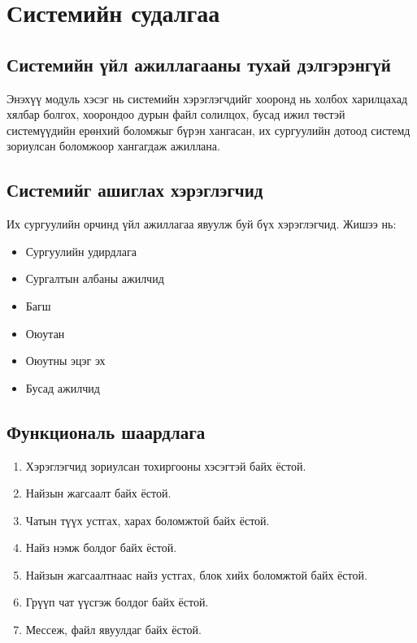 
\chapter{Системийн судалгаа} %
\label{Chapter2} %

\section{Системийн үйл ажиллагааны тухай дэлгэрэнгүй }
Энэхүү модуль хэсэг нь системийн хэрэглэгчдийг хооронд нь холбох харилцахад хялбар болгох, хоорондоо дурын файл солилцох, бусад ижил төстэй системүүдийн ерөнхий боломжыг бүрэн хангасан, их сургуулийн дотоод системд зориулсан боломжоор хангагдаж ажиллана.

\section{Системийг ашиглах хэрэглэгчид}
Их сургуулийн орчинд үйл ажиллагаа явуулж буй бүх хэрэглэгчид.
Жишээ нь: 
\begin{itemize}
\item Сургуулийн удирдлага
\item Сургалтын албаны ажилчид
\item Багш	
\item Оюутан
\item Оюутны эцэг эх
\item Бусад ажилчид
\end{itemize}

\section{Функциональ шаардлага}
\begin{enumerate}
	\item Хэрэглэгчид зориулсан тохиргооны хэсэгтэй байх ёстой.
	\item Найзын жагсаалт байх ёстой.
	\item Чатын түүх устгах, харах боломжтой байх ёстой.
	\item Найз нэмж болдог байх ёстой.
	\item Найзын жагсаалтнаас найз устгах, блок хийх боломжтой байх ёстой.
	\item Грүүп чат үүсгэж болдог байх ёстой.
	\item Мессеж, файл явуулдаг байх ёстой.
\end{enumerate}

